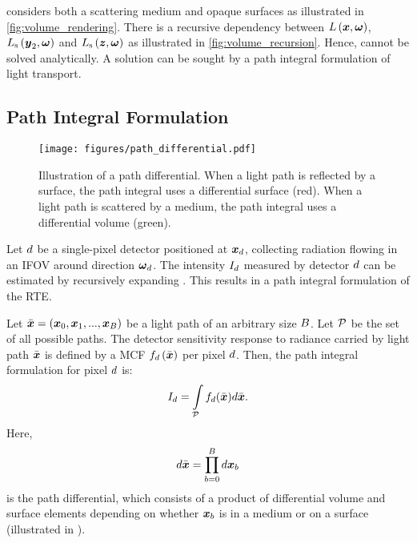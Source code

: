 \documentclass{article}
\begin{document}
\eq{\ref{eq:volume_rendering}} considers both a scattering medium and opaque surfaces as illustrated in \fig\ref{fig:volume_rendering}. There is a recursive dependency between $L\left({\boldsymbol{x},\boldsymbol{\omega}}\right)$, $L_{\text{s}}\left({\boldsymbol{y}_2,\boldsymbol{\omega}}\right)$ and $L_{\text{s}}\left({\boldsymbol{z},\boldsymbol{\omega}}\right)$ as illustrated in \fig\ref{fig:volume_recursion}.  Hence, \eq{\ref{eq:volume_rendering}} cannot be solved analytically. A solution can be sought by a path integral formulation \citep{veach1997robust} of light transport.

\subsection{Path Integral Formulation}
\begin{figure}[b]
  \centering
  \texttt{[image: figures/path\_differential.pdf]}
    \caption{Illustration of a path differential. When a light path is reflected by a surface, the path integral uses a differential surface (red). When a light path is scattered by a medium, the path integral uses a differential volume (green).}  
    \label{fig:path_differential}
\end{figure}
Let $d$ be a single-pixel detector positioned at $\boldsymbol{x}_{d}$, collecting radiation flowing in an \ac{IFOV} around direction $\boldsymbol{\omega}_{d}$. The intensity $I_{d}$ measured by detector $d$ can be estimated by recursively \citep{veach1997robust} expanding \eq{\ref{eq:volume_rendering}}. This results in a path integral formulation of the RTE.

Let $\Bar{\boldsymbol{x}}=\left({\boldsymbol{x}_0,\boldsymbol{x}_1,...,\boldsymbol{x}_{B}}\right)$ be a light path of an arbitrary size $B$. Let $\mathcal{P}$  be the set of all possible paths. The detector sensitivity  response to radiance carried by light path $\Bar{\boldsymbol{x}}$ is defined by a \ac{MCF} $f_{d}\left({\Bar{\boldsymbol{x}}}\right)$ per pixel $d$. Then, the path integral formulation for pixel $d$ is:
\begin{equation}
\label{eq:path_integral_formulation}
I_{\nm} = \intop_{\pathset}\contfunc_{\nm}(\ppath)d\ppath .
\end{equation}
Here,  
\begin{equation}
    d\Bar{\boldsymbol{x}}=\prod_{b=0}^{B}{d\boldsymbol{x}_{b}}
\end{equation}
is the path differential, which consists of a product of differential volume and surface elements depending on whether $\boldsymbol{x}_{b}$ is in a medium or on a surface (illustrated in \fig{\ref{fig:path_differential}}). 
\end{document}
